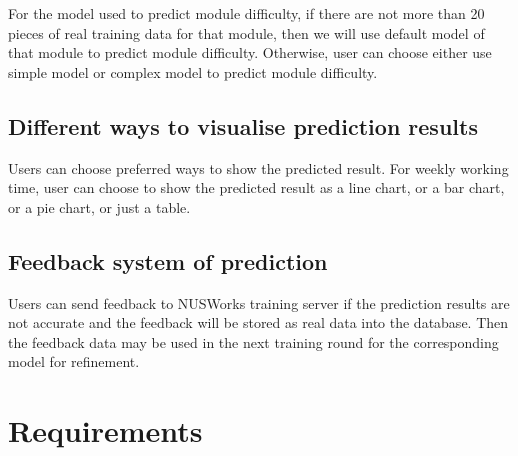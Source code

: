 \documentclass[fyp]{socreport}
\begin{document}
For the model used to predict module difficulty, if there are not more than 20 pieces of real training data for that module, then we will use default model of that module to predict module difficulty. Otherwise, user can choose either use simple model or complex model to predict module difficulty.

\subsection{Different ways to visualise prediction results}
Users can choose preferred ways to show the predicted result. For weekly working time, user can choose to show the predicted result as a line chart, or a bar chart, or a pie chart, or just a table.

\subsection{Feedback system of prediction}
Users can send feedback to NUSWorks training server if the prediction results are not accurate and the feedback will be stored as real data into the database. Then the feedback data may be used in the next training round for the corresponding model for refinement.

\section{Requirements}
\end{document}
